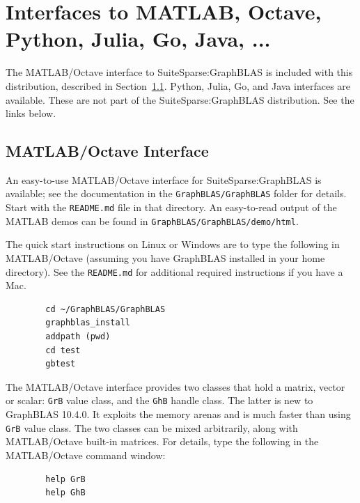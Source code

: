 
\newpage
\section{Interfaces to MATLAB, Octave, Python, Julia, Go, Java, ...} %

The MATLAB/Octave interface to SuiteSparse:GraphBLAS is included with this
distribution, described in Section~\ref{octave}.
Python, Julia, Go, and Java interfaces are available.
These are not part of the SuiteSparse:GraphBLAS distribution.
See the links below.

\subsection{MATLAB/Octave Interface}
\label{octave}

An easy-to-use MATLAB/Octave interface for SuiteSparse:GraphBLAS is available;
see the documentation in the \verb'GraphBLAS/GraphBLAS' folder for details.
Start with the \verb'README.md' file in that directory.  An easy-to-read output
of the MATLAB demos can be found in \verb'GraphBLAS/GraphBLAS/demo/html'.

The quick start instructions on Linux or Windows are to type the following in
MATLAB/Octave (assuming you have GraphBLAS installed in your home directory).
See the \verb'README.md' for additional required instructions if you have a Mac.

{\footnotesize
    \begin{verbatim}
        cd ~/GraphBLAS/GraphBLAS
        graphblas_install
        addpath (pwd)
        cd test
        gbtest \end{verbatim}}

The MATLAB/Octave interface provides two classes that hold a matrix, vector or
scalar: \verb'GrB' value class, and the \verb'GhB' handle class.  The latter
is new to GraphBLAS 10.4.0.  It exploits the memory arenas and is much faster
than using \verb'GrB' value class.  The two classes can be mixed arbitrarily,
along with MATLAB/Octave built-in matrices.  For details, type the following
in the MATLAB/Octave command window:

{\footnotesize
    \begin{verbatim}
        help GrB
        help GhB \end{verbatim}}

